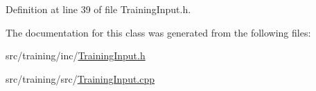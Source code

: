 Definition at line 39 of file Training\-Input.\-h.



The documentation for this class was generated from the following files\-:\begin{DoxyCompactItemize}
\item 
src/training/inc/\hyperlink{_training_input_8h}{Training\-Input.\-h}\item 
src/training/src/\hyperlink{_training_input_8cpp}{Training\-Input.\-cpp}\end{DoxyCompactItemize}
